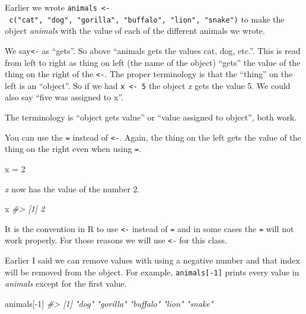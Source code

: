 \documentclass[
]{krantz}
\makeatletter
\newenvironment{Shaded}{\begin{snugshade}}{\end{snugshade}}
\newcommand{\CommentTok}[1]{\textcolor[rgb]{0.37,0.37,0.37}{\textit{#1}}}
\newcommand{\DecValTok}[1]{\textcolor[rgb]{0.06,0.06,0.06}{#1}}
\newcommand{\NormalTok}[1]{#1}
\newcommand{\OtherTok}[1]{\textcolor[rgb]{0.37,0.37,0.37}{#1}}
\newcommand{\SpecialCharTok}[1]{\textcolor[rgb]{0,0,0}{#1}}
\newenvironment{kframe}{%
\medskip{}
\setlength{\fboxsep}{.8em}
 \def\at@end@of@kframe{}%
 \ifinner\ifhmode%
  \def\at@end@of@kframe{\end{minipage}}%
  \begin{minipage}{\columnwidth}%
 \fi\fi%
 \def\FrameCommand##1{\hskip\@totalleftmargin \hskip-\fboxsep
 \colorbox{shadecolor}{##1}\hskip-\fboxsep
     \hskip-\linewidth \hskip-\@totalleftmargin \hskip\columnwidth}%
 \MakeFramed {\advance\hsize-\width
   \@totalleftmargin\z@ \linewidth\hsize
   \@setminipage}}%
 {\par\unskip\endMakeFramed%
 \at@end@of@kframe}
\renewenvironment{Shaded}{\begin{kframe}}{\end{kframe}}
\makeatother
\begin{document}
Earlier we wrote \texttt{animals\ \textless{}-\ c("cat",\ "dog",\ "gorilla",\ "buffalo",\ "lion",\ "snake")} to make the object \emph{animals} with the value of each of the different animals we wrote.

We say\texttt{\textless{}-} as ``gets''. So above ``animals gets the values cat, dog, etc.''. This is read from left to right as thing on left (the name of the object) ``gets'' the value of the thing on the right of the \texttt{\textless{}-}. The proper terminology is that the ``thing'' on the left is an ``object''. So if we had \texttt{x\ \textless{}-\ 5} the object \emph{x} gets the value 5. We could also say ``five was assigned to x''.

The terminology is ``object gets value'' or ``value assigned to object'', both work.

You can use the \texttt{=} instead of \texttt{\textless{}-}. Again, the thing on the left gets the value of the thing on the right even when using \texttt{=}.

\begin{Shaded}
\begin{Highlighting}[]
\NormalTok{x }\OtherTok{=} \DecValTok{2}
\end{Highlighting}
\end{Shaded}

\emph{x} now has the value of the number 2.

\begin{Shaded}
\begin{Highlighting}[]
\NormalTok{x}
\CommentTok{\#\textgreater{} [1] 2}
\end{Highlighting}
\end{Shaded}

It is the convention in R to use \texttt{\textless{}-} instead of \texttt{=} and in some cases the \texttt{=} will not work properly. For those reasons we will use \texttt{\textless{}-} for this class.

Earlier I said we can remove values with using a negative number and that index will be removed from the object. For example, \texttt{animals{[}-1{]}} prints every value in \emph{animals} except for the first value.

\begin{Shaded}
\begin{Highlighting}[]
\NormalTok{animals[}\SpecialCharTok{{-}}\DecValTok{1}\NormalTok{]}
\CommentTok{\#\textgreater{} [1] "dog"     "gorilla" "buffalo" "lion"    "snake"}
\end{Highlighting}
\end{Shaded}
\end{document}
